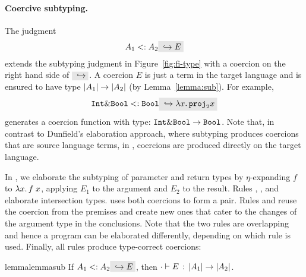 \paragraph{Coercive subtyping.}

The judgment
\[
A_1 \subtype A_2 \yields E
\]
extends the subtyping judgment in Figure~\ref{fig:fi-type} with a coercion
on the right hand side of $ \yields {} $. A coercion $ E $ is just a term
in the target language and is ensured to have type
$ \im {A_1} \to \im {A_2} $ (by Lemma~\ref{lemma:sub}). For example,
\[
\code{Int} \inter \code{Bool} \subtype \code{Bool} \yields {\lamty x {\im {\code{Int} \inter \code{Bool}}} {\proj 2 x}}
\]
generates a coercion function with type: $\code{Int} \inter \code{Bool} \to \code{Bool}$.
Note that, in contrast to Dunfield's elaboration approach, where subtyping produces
coercions that are source language terms, in \name, coercions are
produced directly on the target language.

In , we elaborate the subtyping of
parameter and return types by $\eta$-expanding $f$ to $\lamty x {\im {A_3}}
{\app f x}$, applying $E_1$ to the argument and $E_2$ to the result. Rules
, , and
 elaborate intersection types.
 uses both coercions to form a pair. Rules
 and  reuse the coercion
from the premises and create new ones that cater to the changes of the argument
type in the conclusions. Note that the two rules are overlapping and
hence a program can be elaborated differently, depending on which rule
is used. Finally, all rules produce type-correct coercions:



\begin{restatable}{lemma}{lemmasub}
  \label{lemma:sub}
  If $ A_1 \subtype A_2 \yields E $, then $ \jtype \cdot E {\im {A_1} \to \im {A_2}} $.
\end{restatable}

